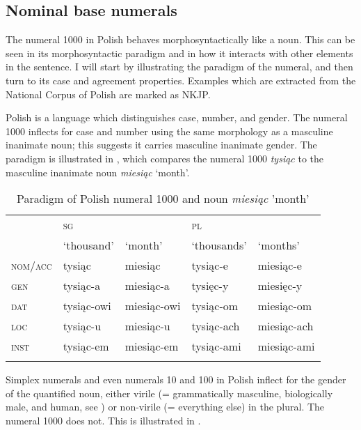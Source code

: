 \documentclass[output=paper]{langscibook}
\begin{document}
\subsection{Nominal base numerals} \label{klo:nominalBase}

The numeral 1000 in Polish behaves morphosyntactically like a noun. This can be seen in its morphosyntactic paradigm and in how it interacts with other elements in the sentence. I will start by illustrating the paradigm of the numeral, and then turn to its case and agreement properties. Examples which are extracted from the National Corpus of Polish are marked as NKJP.

Polish is a language which distinguishes case, number, and gender. The numeral 1000 inflects for case and number using the same morphology as a masculine inanimate noun; this suggests it carries masculine inanimate gender. The paradigm is illustrated in , which compares the numeral 1000 \textit{tysiąc} to the masculine inanimate noun \textit{miesiąc} `month'.

\begin{table}
\caption{Paradigm of Polish numeral 1000 and noun \textit{miesiąc} 'month'}
\label{klo:tab:Polish1000}
 \begin{tabular}{lllll} 
  \lsptoprule
            & \textsc{sg} & & \textsc{pl} & \\ 
            & `thousand' & `month' & `thousands' & `months'\\
  \midrule
  \textsc{nom}/\textsc{acc}  &   tysiąc & miesiąc & tysiąc-e & miesiąc-e  \\
  \textsc{gen} & tysiąc-a & miesiąc-a & tysięc-y & miesięc-y \\
  \textsc{dat} & tysiąc-owi & miesiąc-owi & tysiąc-om & miesiąc-om \\
  \textsc{loc} & tysiąc-u & miesiąc-u & tysiąc-ach & miesiąc-ach \\
  \textsc{inst} & tysiąc-em & miesiąc-em & tysiąc-ami & miesiąc-ami \\
  \lspbottomrule
 \end{tabular}
\end{table}

Simplex numerals and even numerals 10 and 100 in Polish inflect for the gender of the quantified noun, either virile (= grammatically masculine, biologically male, and human, see \citealt{rappaport2011gender}) or non-virile (= everything else) in the plural. The numeral 1000 does not. This is illustrated in .
\end{document}
